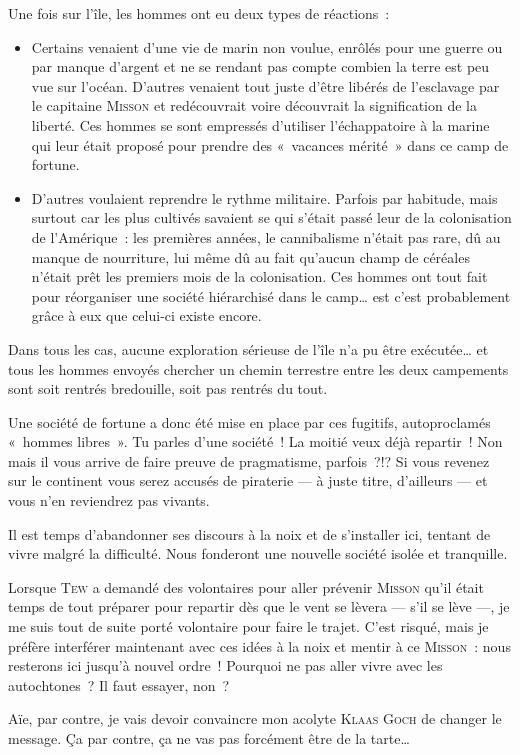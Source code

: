 {	Une fois sur l’île, les hommes ont eu deux types de réactions~:
	\begin{itemize}
		\item Certains venaient d’une vie de marin non voulue, enrôlés pour une guerre ou par manque d’argent et ne se rendant pas compte combien la terre est peu vue sur l’océan.  D’autres venaient tout juste d’être libérés de l’esclavage par le capitaine \textsc{Misson} et redécouvrait voire découvrait la signification de la liberté.
			Ces hommes se sont empressés d’utiliser l’échappatoire à la marine qui leur était proposé pour prendre des «~vacances mérité~» dans ce camp de fortune.
		\item D’autres voulaient reprendre le rythme militaire.  Parfois par habitude, mais surtout car les plus cultivés savaient se qui s’était passé leur de la colonisation de l’Amérique~:  les premières années, le cannibalisme n’était pas rare, dû au manque de nourriture, lui même dû au fait qu’aucun champ de céréales n’était prêt les premiers mois de la colonisation.
			Ces hommes ont tout fait pour réorganiser une société hiérarchisé dans le camp… est c’est probablement grâce à eux que celui-ci existe encore.
	\end{itemize}
	Dans tous les cas, aucune exploration sérieuse de l’île n’a pu être exécutée… et tous les hommes envoyés chercher un chemin terrestre entre les deux campements sont soit rentrés bredouille, soit pas rentrés du tout.

	Une société de fortune a donc été mise en place par ces fugitifs, autoproclamés «~hommes libres~».
	Tu parles d’une société~!  La moitié veux déjà repartir~!
	Non mais il vous arrive de faire preuve de pragmatisme, parfois~?!?
	Si vous revenez sur le continent vous serez accusés de piraterie — à juste titre, d’ailleurs — et vous n’en reviendrez pas vivants.

	Il est temps d’abandonner ses discours à la noix et de s’installer ici, tentant de vivre malgré la difficulté.
	Nous fonderont une nouvelle société isolée et tranquille.

	Lorsque \textsc{Tew} a demandé des volontaires pour aller prévenir \textsc{Misson} qu’il était temps de tout préparer pour repartir dès que le vent se lèvera — s’il se lève —, je me suis tout de suite porté volontaire pour faire le trajet.
	C’est risqué, mais je préfère interférer maintenant avec ces idées à la noix et mentir à ce \textsc{Misson}~:  nous resterons ici jusqu’à nouvel ordre~!
	Pourquoi ne pas aller vivre avec les autochtones~?  Il faut essayer, non~?

	Aïe, par contre, je vais devoir convaincre mon acolyte \textsc{Klaas Goch} de changer le message.
	Ça par contre, ça ne vas pas forcément être de la tarte…
}

